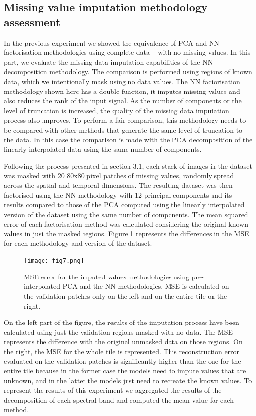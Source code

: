 \documentclass[essd, manuscript]{copernicus}
\begin{document}
\subsection{Missing value imputation methodology assessment}
In the previous experiment we showed the equivalence of PCA and NN factorisation methodologies using complete data -- with no missing values. In this part, we evaluate the missing data imputation capabilities of the NN decomposition methodology. The comparison is performed using regions of known data, which we intentionally mask using no data values. The NN factorisation methodology shown here has a double function, it imputes missing values and also reduces the rank of the input signal. As the number of components or the level of truncation is increased, the quality of the missing data imputation process also improves. To perform a fair comparison, this methodology needs to be compared with other methods that generate the same level of truncation to the data. In this case the comparison is made with the PCA decomposition of the linearly interpolated data using the same number of components. 

Following the process presented in section 3.1, each stack of images in the dataset was masked with 20 80x80 pixel patches of missing values, randomly spread across the spatial and temporal dimensions. The resulting dataset was then factorised using the NN methodology with 12 principal components and its results compared to those of the PCA computed using the linearly interpolated version of the dataset using the same number of components. The mean squared error of each factorisation method was calculated considering the original known values in just the masked regions. Figure \ref{missing_data_imputation_cmp} represents the differences in the MSE for each methodology and version of the dataset.

\begin{figure}
    \texttt{[image: fig7.png]}
    \caption{MSE error for the imputed values methodologies using pre-interpolated PCA and the NN methodologies. MSE is calculated on the validation patches only on the left and on the entire tile on the right.}%
    \label{missing_data_imputation_cmp}%
\end{figure}

On the left part of the figure, the results of the imputation process have been calculated using just the validation regions masked with no data. The MSE represents the difference with the original unmasked data on those regions. On the right, the MSE for the whole tile is represented. This reconstruction error evaluated on the validation patches is significantly higher than the one for the entire tile because in the former case the models need to impute values that are unknown, and in the latter the models just need to recreate the known values. To represent the results of this experiment we aggregated the results of the decomposition of each spectral band and computed the mean value for each method.
\end{document}
